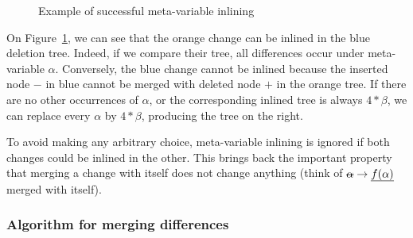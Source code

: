 \documentclass[a4paper,11pt]{article}
\newcommand\del[1]{\text{\st{$#1$}}}
\newcommand\ins[1]{\text{\ul{$#1$}}}
\newcommand\change[2]{\del{#1} \rightarrow \ins{#2}}
\begin{document}
\begin{figure}[ht]
\begin{minipage}{0.49\textwidth}
\end{minipage}
\caption{Example of successful meta-variable inlining}
\label{fig:metavar_inlining}
\end{figure}

On Figure~\ref{fig:metavar_inlining}, we can see that the orange change can be
inlined in the blue deletion tree. Indeed, if we compare their tree, all
differences occur under meta-variable $\alpha$. Conversely, the blue change
cannot be inlined because the inserted node $-$ in blue cannot be merged with
deleted node $+$ in the orange tree. If there are no other occurrences of
$\alpha$, or the corresponding inlined tree is always $4*\beta$, we can replace
every $\alpha$ by $4*\beta$, producing the tree on the right.

To avoid making any arbitrary choice, meta-variable inlining is ignored if both
changes could be inlined in the other. This brings back the important property
that merging a change with itself does not change anything (think of
$\change{\alpha}{f(\alpha)}$ merged with itself).

\subsubsection{Algorithm for merging differences}
\label{sec:syntactic_merge_algo}
\end{document}
